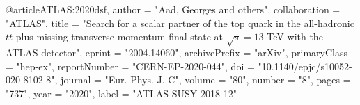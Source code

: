 @article{ATLAS:2020dsf,
    author = "Aad, Georges and others",
    collaboration = "ATLAS",
    title = "{Search for a scalar partner of the top quark in the all-hadronic $t{\bar{t}}$ plus missing transverse momentum final state at $\sqrt{s}=13$ TeV with the ATLAS detector}",
    eprint = "2004.14060",
    archivePrefix = "arXiv",
    primaryClass = "hep-ex",
    reportNumber = "CERN-EP-2020-044",
    doi = "10.1140/epjc/s10052-020-8102-8",
    journal = "Eur. Phys. J. C",
    volume = "80",
    number = "8",
    pages = "737",
    year = "2020",
    label = "ATLAS-SUSY-2018-12"
}

